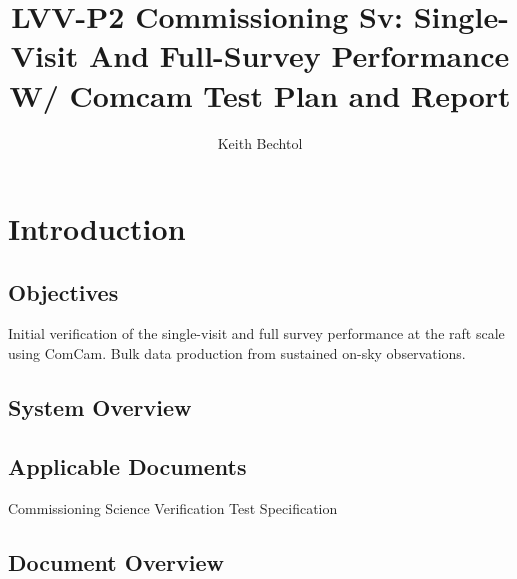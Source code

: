 \documentclass[DM,lsstdraft,STR,toc]{lsstdoc}
\begin{document}
\def\milestoneName{Commissioning Sv: Single-Visit And Full-Survey Performance W/ Comcam}
\def\milestoneId{LVV-P2}
\def\product{Commissioning Science Verification}


\title{ LVV-P2 Commissioning Sv: Single-Visit And Full-Survey Performance W/ Comcam Test Plan and Report}
\setDocRef{\lsstDocType-\lsstDocNum}
\date{\vcsdate}
\author{ Keith Bechtol }






\maketitle

\section{Introduction}
\label{sect:intro}


\subsection{Objectives}
\label{sect:objectives}

Initial verification of the single-visit and full survey performance at
the raft scale using ComCam. Bulk data production from sustained on-sky
observations.



\subsection{System Overview}
\label{sect:systemoverview}

\subsection{Applicable Documents}\label{applicable-documents}

 Commissioning Science Verification Test Specification


\subsection{Document Overview}
\label{sect:docoverview}
\end{document}
